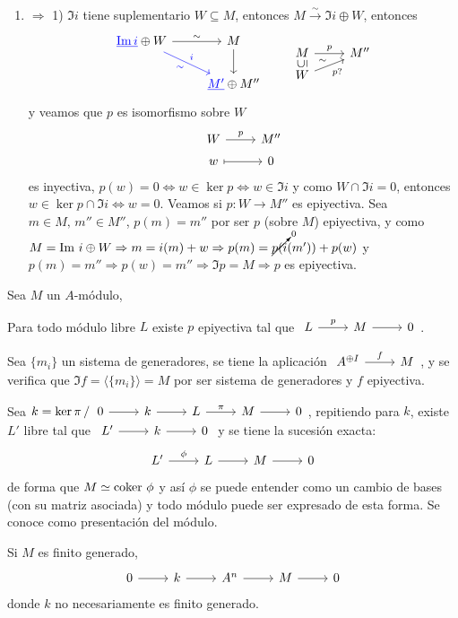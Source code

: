 \begin{dem}
\begin{enumerate}[1)]
        Veamos que $s$ es secci\'on de $p$, es decir, veamos que $p(s(m''))=m'' \, / \, m\coloneq s(m'')$. Aplicando $p$ en $i \circ r + s \circ p =Id_M$,
        $$p\circ s \circ p =p \Rightarrow p(s(m')) = m'' \text{ pero } m''=p(m) \,  (\text{por ser }p\text{ epiyectiva})$$
        $$ \Rightarrow p(s(p(m))) = p(m) = m''$$
        Sea $m \in \Im  s \cap \Im i $, 
        $$m = s(m'') \Rightarrow p(m) = p(s(m'')) = m'' \text{ y } p(m) = 0 \, (m \in \Im i = \ker  p) \Rightarrow m''=0$$
        por ser $s(0)=0=m$. 

        \item $\Rightarrow$ 1) $\Im i$ tiene suplementario $W\subseteq M$, entonces $M \overset{\sim}{\longrightarrow} \Im i \oplus W$, entonces
        $$\bt \arrow[blue]{rd}{i}[swap]{\sim} \textcolor{blue}{\underline{\Im i}} \oplus W \arrow{r}{\sim} & M \arrow{d} \\
         & \textcolor{blue}{\underline{M'}} \oplus M''\et \qquad \bt  M \arrow{r}{p} & M'' \\[-5mm] \arrow[phantom, u, "\rotatebox{90}{$\subseteq$}"] W \arrow{ru}[swap]{p ?}{\sim} \et  $$
         y veamos que $p$ es isomorfismo sobre $W$ 
         $$\bt W\arrow{r}{p} & M '' \\[-5mm] w \arrow[mapsto]{r} & 0 \et$$
         es inyectiva, $p(w) = 0 \iff w \in \ker  p \iff w \in \Im i$ y como $W \cap \Im i=0$, entonces
          $w \in \ker p \cap \Im i \iff w=0$. Veamos si $p: W \longrightarrow M''$ es epiyectiva. Sea $m \in M, \, m''\in M''$, $p(m)=m''$ por ser $p$ (sobre $M$) epiyectiva, y como $M = \Im\,  i \oplus W \Rightarrow m =i(m) + w \Rightarrow p(m) = \cancelto{0}{p(i}(m')) + p(w)$ y $p(m) = m'' \Rightarrow p(w) = m'' \Rightarrow \Im p =M \Rightarrow p$ es epiyectiva.
\end{enumerate}
\end{dem}
\newpage
Sea $M$ un $A$-módulo,
\begin{prop}
    Para todo m\'odulo libre $L$ existe $p$ epiyectiva tal que $\bt L \arrow{r}{p} & M \arrow{r} & 0 \et$.
\end{prop}
\begin{dem}
    Sea $\{m_i\}$ un sistema de generadores, se tiene la aplicaci\'on $\bt A^{\oplus I} \arrow{r}{f} & M\et$, y se verifica que $\Im f = \langle \{m_i\} \rangle = M$ por ser sistema de generadores y $f$ epiyectiva.

    Sea $k = \ker  \pi \, / \, \bt 0 \arrow{r} & k \arrow{r} & L \arrow{r}{\pi} & M \arrow{r} & 0 \et$, repitiendo para $k$, existe $L'$ libre tal que $\bt L' \arrow{r} & k \arrow{r} & 0 \et$ y se tiene la sucesi\'on exacta:
    $$\bt L' \arrow{r}{\phi} & L \arrow{r} & M \arrow{r} & 0 \et$$
    de forma que $M \simeq \operatorname{coker} \, \phi$ y así $\phi$ se puede entender como un cambio de bases (con su matriz asociada) y todo m\'odulo puede ser expresado de esta forma. Se conoce como presentaci\'on del m\'odulo. 

    Si $M$ es finito generado, 
    $$\bt 0 \arrow{r} & k \arrow{r} & A^n \arrow{r} & M \arrow{r} & 0\et$$
    donde $k$ no necesariamente es finito generado.
 \end{dem}
